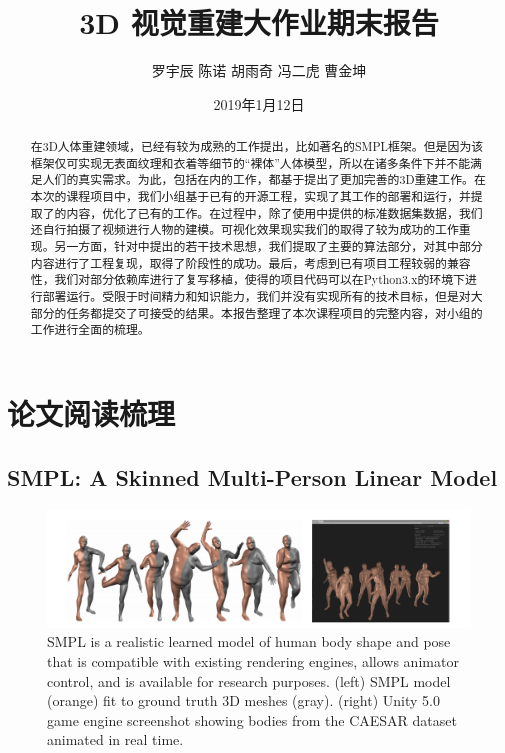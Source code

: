 \documentclass{article}
\title{3D 视觉重建大作业期末报告}
\author{罗宇辰 \quad 陈诺 \quad 胡雨奇 \quad 冯二虎 \quad 曹金坤}
\date{2019年1月12日}
\begin{document}
\maketitle

\begin{center}

\end{center} 

\tableofcontents
\clearpage

\begin{abstract}
    在3D人体重建领域，已经有较为成熟的工作提出，比如著名的SMPL\cite{smpl}框架。但是因为该框架仅可实现无表面纹理和衣着等细节的“裸体”人体模型，所以在诸多条件下并不能满足人们的真实需求。为此，包括\cite{paper1,paper2}在内的工作，都基于\cite{smpl}提出了更加完善的3D重建工作。在本次的课程项目中，我们小组基于已有的开源工程\cite{paper1code}，实现了其工作的部署和运行，并提取了\cite{paper1,paper2}的内容，优化了已有的工作。在过程中，除了使用\cite{paper1homepage}中提供的标准数据集数据，我们还自行拍摄了视频进行人物的建模。可视化效果现实我们的取得了较为成功的工作重现。另一方面，针对\cite{paper2}中提出的若干技术思想，我们提取了主要的算法部分，对其中部分内容进行了工程复现，取得了阶段性的成功。最后，考虑到已有项目工程较弱的兼容性，我们对部分依赖库进行了复写移植，使得\cite{paper1code}的项目代码可以在Python3.x的环境下进行部署运行。受限于时间精力和知识能力，我们并没有实现所有的技术目标，但是对大部分的任务都提交了可接受的结果。本报告整理了本次课程项目的完整内容，对小组的工作进行全面的梳理。
\end{abstract}
\section{论文阅读梳理}
\subsection{SMPL: A Skinned Multi-Person Linear Model}

\begin{figure}[H]
	\centering
	\includegraphics[width=16cm]{figure/smpl}	
	\caption{SMPL is a realistic learned model of human body shape and pose that is compatible with existing rendering engines, allows
animator control, and is available for research purposes. (left) SMPL model (orange) fit to ground truth 3D meshes (gray). (right) Unity 5.0
game engine screenshot showing bodies from the CAESAR dataset animated in real time.}
	\label{smpl}
\end{figure}
\end{document}

